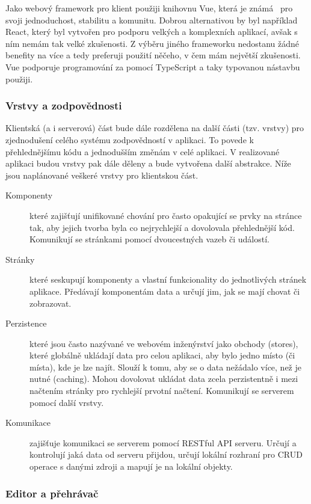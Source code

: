 Jako webový framework pro klient použiji knihovnu Vue, která je známá~\cite{potter_2023} pro svoji jednoduchost, stabilitu a komunitu.
Dobrou alternativou by byl například React, který byl vytvořen pro podporu velkých a komplexních aplikací, avšak s ním nemám tak velké zkušenosti.
Z výběru jiného frameworku nedostanu žádné benefity na více a tedy preferuji použití něčeho, v čem mám největší zkušenosti.
Vue podporuje programování za pomocí TypeScript a taky typovanou nástavbu použiji.

\subsubsection{Vrstvy a zodpovědnosti}

Klientská (a i serverová) část bude dále rozdělena na další části (tzv. vrstvy) pro zjednodušení celého systému zodpovědností v aplikaci.
To povede k přehlednějšímu kódu a jednodušším změnám v celé aplikaci.
V realizované aplikaci budou vrstvy pak dále děleny a bude vytvořena další abstrakce.
Níže jsou naplánované veškeré vrstvy pro klientskou část.

\begin{description}
    \item[Komponenty] které zajišťují unifikované chování pro často opakující se prvky na stránce tak, aby jejich tvorba byla co nejrychlejší a dovolovala přehlednější kód. Komunikují se stránkami pomocí dvoucestných vazeb či událostí.
    \item[Stránky] které seskupují komponenty a vlastní funkcionality do jednotlivých stránek aplikace. Předávají komponentám data a určují jim, jak se mají chovat či zobrazovat.
    \item[Perzistence] které jsou často nazývané ve webovém inženýrství jako obchody (stores), které globálně ukládají data pro celou aplikaci, aby bylo jedno místo (či místa), kde je lze najít. Slouží k tomu, aby se o data nežádalo více, než je nutné (caching). Mohou dovolovat ukládat data zcela perzistentně i mezi načtením stránky pro rychlejší prvotní načtení. Komunikují se serverem pomocí další vrstvy.
    \item[Komunikace] zajišťuje komunikaci se serverem pomocí RESTful API serveru. Určují a kontrolují jaká data od serveru přijdou, určují lokální rozhraní pro CRUD operace s danými zdroji a mapují je na lokální objekty.
\end{description}

\subsubsection{Editor a přehrávač}

